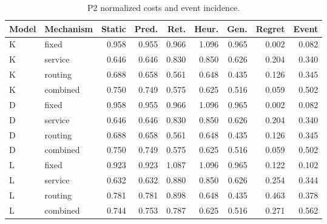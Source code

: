 \begin{table}[htbp]\caption{P2 normalized costs and event incidence.}\centering\small\setlength{\tabcolsep}{3pt}

\begin{tabular}{llrrrrrrr}\toprule

Model & Mechanism & Static & Pred. & Ret. & Heur. & Gen. & Regret & Event\\\midrule

K & fixed & 0.958 & 0.955 & 0.966 & 1.096 & 0.965 & 0.002 & 0.082\\

K & service & 0.646 & 0.646 & 0.830 & 0.850 & 0.626 & 0.204 & 0.340\\

K & routing & 0.688 & 0.658 & 0.561 & 0.648 & 0.435 & 0.126 & 0.345\\

K & combined & 0.750 & 0.749 & 0.575 & 0.625 & 0.516 & 0.059 & 0.502\\

D & fixed & 0.958 & 0.955 & 0.966 & 1.096 & 0.965 & 0.002 & 0.082\\

D & service & 0.646 & 0.646 & 0.830 & 0.850 & 0.626 & 0.204 & 0.340\\

D & routing & 0.688 & 0.658 & 0.561 & 0.648 & 0.435 & 0.126 & 0.345\\

D & combined & 0.750 & 0.749 & 0.575 & 0.625 & 0.516 & 0.059 & 0.502\\

L & fixed & 0.923 & 0.923 & 1.087 & 1.096 & 0.965 & 0.122 & 0.102\\

L & service & 0.632 & 0.632 & 0.880 & 0.850 & 0.626 & 0.254 & 0.344\\

L & routing & 0.781 & 0.781 & 0.898 & 0.648 & 0.435 & 0.463 & 0.378\\

L & combined & 0.744 & 0.753 & 0.787 & 0.625 & 0.516 & 0.271 & 0.562\\

\bottomrule\end{tabular}\end{table}

